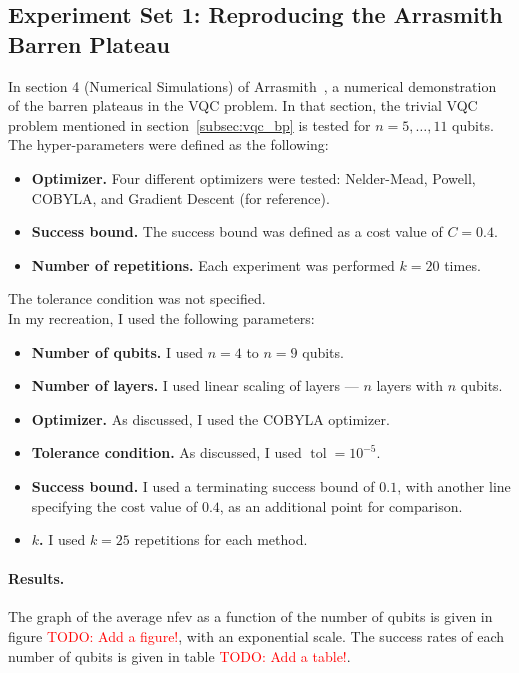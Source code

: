 \documentclass[a4paper,12pt]{article}
\newcommand{\mytodo}[1]{\textcolor{red}{TODO: #1}}
\newcommand{\e}[1]{ 10^{#1}}
\DeclareMathOperator{\tol}{tol}
\newenvironment{denseitemize}%
  {\begin{itemize}%
    \setlength{\itemsep}{0pt}}%
  {\end{itemize}}
\begin{document}
\subsection{Experiment Set 1: Reproducing the Arrasmith Barren Plateau} \label{subsec:reproduce}
In section 4 (Numerical Simulations) of Arrasmith~\cite{arrasmith_effect_2021}, a numerical demonstration of the barren plateaus in the VQC problem.
In that section, the trivial VQC problem mentioned in section~\ref{subsec:vqc_bp} is tested for $n=5,\dots,11$ qubits.
The hyper-parameters were defined as the following:
\begin{denseitemize}
    \item \textbf{Optimizer.} Four different optimizers were tested: Nelder-Mead, Powell, COBYLA, and Gradient Descent (for reference).
    \item \textbf{Success bound.} The success bound was defined as a cost value of $C=0.4$.
    \item \textbf{Number of repetitions.} Each experiment was performed $k=20$ times.
\end{denseitemize}
The tolerance condition was not specified.\\

In my recreation, I used the following parameters:

\begin{denseitemize}
    \item \textbf{Number of qubits.} I used $n=4$ to $n=9$ qubits.
    \item \textbf{Number of layers.} I used linear scaling of layers --- $n$ layers with $n$ qubits.
    \item \textbf{Optimizer.} As discussed, I used the COBYLA optimizer.
    \item \textbf{Tolerance condition.} As discussed, I used $\tol=\e{-5}$.
    \item \textbf{Success bound.} I used a terminating success bound of $0.1$, with another line specifying the cost value of $0.4$, as an additional point for comparison.
    \item \textbf{$k$.} I used $k=25$ repetitions for each method.
\end{denseitemize}

\paragraph*{Results.}
The graph of the average nfev as a function of the number of qubits is given in figure \mytodo{Add a figure!}, with an exponential scale.
The success rates of each number of qubits is given in table \mytodo{Add a table!}.
\end{document}
